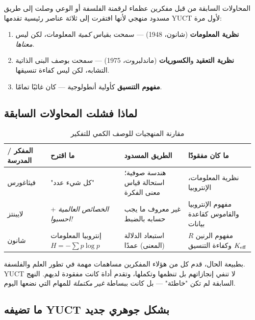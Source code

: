 \documentclass[11pt,a4paper]{article}
\begin{document}
	المحاولات السابقة من قبل مفكرين عظماء لرقمنة الفلسفة أو الوعي وصلت إلى طريق مسدود منهجي لأنها افتقرت إلى ثلاثة عناصر رئيسية تقدمها YUCT لأول مرة:
	
	\begin{enumerate}
		\item \textbf{نظرية المعلومات} (شانون، 1948) — سمحت بقياس \emph{كمية} المعلومات، لكن ليس \emph{معناها}.
		\item \textbf{نظرية التعقيد} و\textbf{الكسوريات} (ماندلبروت، 1975) — سمحت بوصف البنى الذاتية التشابه، لكن ليس كفاءة تنسيقها.
		\item \textbf{مفهوم التنسيق} كأولية أنطولوجية — كان غائبًا تمامًا.
	\end{enumerate}
	
	\subsection{لماذا فشلت المحاولات السابقة}
	
	\begin{table}[H]
		\centering
		\caption{مقارنة المنهجيات للوصف الكمي للتفكير}
		\label{tab:method-comparison}
		\begin{tabular}{p{3cm}p{3.5cm}p{3.5cm}p{4cm}}
			\toprule
			\textbf{المفكر / المدرسة} & \textbf{ما اقترح} & \textbf{الطريق المسدود} & \textbf{ما كان مفقودًا} \\
			\midrule
			فيثاغورس & "كل شيء عدد" & هندسة صوفية؛ استحالة قياس معنى الفكرة & نظرية المعلومات، الإنتروبيا \\
			لايبنتز & \emph{الخصائص العالمية} + \emph{احسبوا!} & غير معروف ما يجب حسابه بالضبط & مفهوم الإنتروبيا والقاموس كقاعدة بيانات \\
			شانون & إنتروبيا المعلومات \( H = -\sum p \log p \) & استبعاد الدلالة (المعنى) عمدًا & مفهوم الرنين \(R\) وكفاءة التنسيق \(\Keff\) \\
			\bottomrule
		\end{tabular}
	\end{table}
	
	بطبيعة الحال، قدم كل من هؤلاء المفكرين مساهمات مهمة في تطور العلم والفلسفة. YUCT لا تنفي إنجازاتهم بل تنظمها وتكملها، وتقدم أداة كانت مفقودة لديهم. النهج السابقة لم تكن "خاطئة" — بل كانت ببساطة \emph{غير مكتملة} للمهام التي نضعها اليوم.
	
	\subsection{ما تضيفه YUCT بشكل جوهري جديد}
	
\end{document}
